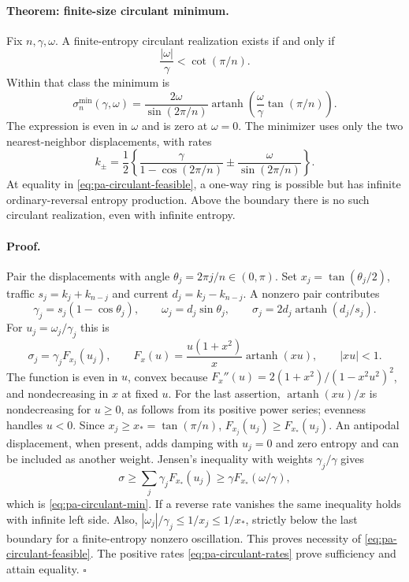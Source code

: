 \paragraph{Theorem: finite-size circulant minimum.}
Fix $n,\gamma,\omega$. A finite-entropy circulant realization exists if and
only if
\begin{equation}
 \frac{|\omega|}{\gamma}<\cot(\pi/n).
 \label{eq:pa-circulant-feasible}
\end{equation}
Within that class the minimum is
\begin{equation}
 \boxed{\quad
 \sigma_n^{\min}(\gamma,\omega)
 =\frac{2\omega}{\sin(2\pi/n)}
   \operatorname{artanh}\!\left(
       \frac{\omega}{\gamma}\tan(\pi/n)\right).
 \quad}
 \label{eq:pa-circulant-min}
\end{equation}
The expression is even in $\omega$ and is zero at $\omega=0$. The minimizer
uses only the two nearest-neighbor displacements, with rates
\begin{equation}
 k_{\pm}=\frac12\left\{
 \frac{\gamma}{1-\cos(2\pi/n)}
 \mathbin{\pm}\frac{\omega}{\sin(2\pi/n)}\right\}.
 \label{eq:pa-circulant-rates}
\end{equation}
At equality in \eqref{eq:pa-circulant-feasible}, a one-way ring is possible
but has infinite ordinary-reversal entropy production. Above the boundary
there is no such circulant realization, even with infinite entropy.

\paragraph{Proof.}
Pair the displacements with angle $\theta_j=2\pi j/n\in(0,\pi)$.
Set $x_j=\tan(\theta_j/2)$, traffic $s_j=k_j+k_{n-j}$ and
current $d_j=k_j-k_{n-j}$. A nonzero pair contributes
\[
 \gamma_j=s_j(1-\cos\theta_j),\qquad
 \omega_j=d_j\sin\theta_j,\qquad
 \sigma_j=2d_j\operatorname{artanh}(d_j/s_j).
\]
For $u_j=\omega_j/\gamma_j$ this is
\[
 \sigma_j=\gamma_j F_{x_j}(u_j),\qquad
 F_x(u)=\frac{u(1+x^2)}{x}\operatorname{artanh}(xu),
 \qquad |xu|<1.
\]
The function is even in $u$, convex because
$F_x''(u)=2(1+x^2)/(1-x^2u^2)^2$, and nondecreasing in $x$ at fixed $u$.
For the last assertion, $\operatorname{artanh}(xu)/x$ is nondecreasing
for $u\geq0$, as follows from its positive power series; evenness handles
$u<0$. Since $x_j\geq x_*=\tan(\pi/n)$,
$F_{x_j}(u_j)\geq F_{x_*}(u_j)$. An antipodal displacement, when present,
adds damping with $u_j=0$ and zero entropy and can be included as another
weight. Jensen's inequality with weights $\gamma_j/\gamma$ gives
\[
 \sigma\geq\sum_j\gamma_j F_{x_*}(u_j)
 \geq\gamma F_{x_*}(\omega/\gamma),
\]
which is \eqref{eq:pa-circulant-min}. If a reverse rate vanishes the same
inequality holds with infinite left side. Also,
$|\omega_j|/\gamma_j\leq1/x_j\leq1/x_*$, strictly below the last
boundary for a finite-entropy nonzero oscillation. This proves necessity
of \eqref{eq:pa-circulant-feasible}. The positive rates
\eqref{eq:pa-circulant-rates} prove sufficiency and attain equality.
\hfill$\square$

